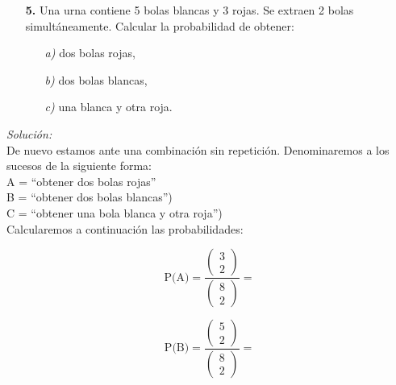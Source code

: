 \documentclass[11pt,a4paper]{article}
\theoremstyle{definition}
\begin{document}


\pagebreak

\begin{itemize}
	\item[\textbf{5.}] Una urna contiene 5 bolas blancas y 3 rojas. Se extraen 2 bolas simultáneamente. Calcular la probabilidad de obtener:


	\begin{itemize}
		\item[\emph{a)}] dos bolas rojas,
		\item[\emph{b)}] dos bolas blancas,
		\item[\emph{c)}] una blanca y otra roja.
	\end{itemize}
\end{itemize}

{\color{grey}\hrulefill}

\emph{Solución:}\\

De nuevo estamos ante una combinación sin repetición. Denominaremos a los sucesos de la siguiente forma:\\

\hspace{1cm}A = ``obtener dos bolas rojas''\\
\hspace*{1cm}B = ``obtener dos bolas blancas'')\\
\hspace*{1cm}C = ``obtener una bola blanca y otra roja'')\\

Calcularemos a continuación las probabilidades:

$$\text{P(A)} = \frac{\left(\begin{matrix}3 \\ 2\end{matrix}\right)}{\left(\begin{matrix}8 \\ 2\end{matrix}\right)}=$$

$$\text{P(B)} = \frac{\left(\begin{matrix}5 \\ 2\end{matrix}\right)}{\left(\begin{matrix}8 \\ 2\end{matrix}\right)}=$$
\end{document}
